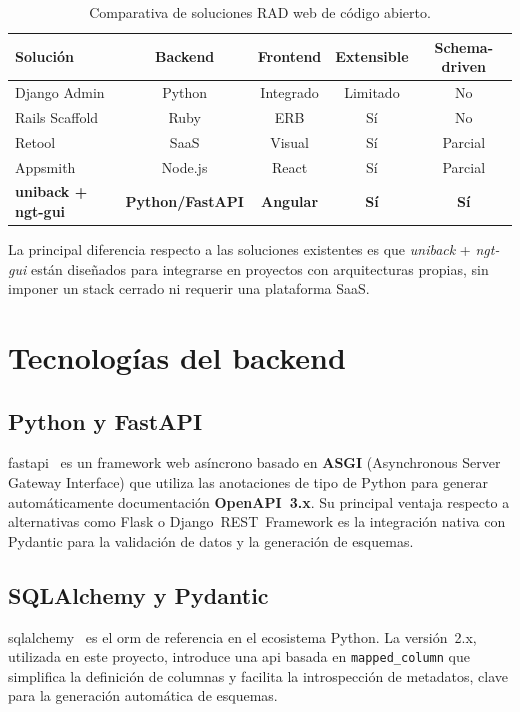 \begin{table}[H]
  \centering
  \caption{Comparativa de soluciones RAD web de código abierto.}
  \label{tab:comparativa-rad}
  \begin{tabular}{lcccc}
    \toprule
    \textbf{Solución} & \textbf{Backend} & \textbf{Frontend} & \textbf{Extensible} &
    \textbf{Schema-driven} \\
    \midrule
    Django Admin & Python & Integrado & Limitado & No \\
    Rails Scaffold & Ruby & ERB & Sí & No \\
    Retool & SaaS & Visual & Sí & Parcial \\
    Appsmith & Node.js & React & Sí & Parcial \\
    \textbf{uniback + ngt-gui} & \textbf{Python/FastAPI} & \textbf{Angular} &
    \textbf{Sí} & \textbf{Sí} \\
    \bottomrule
  \end{tabular}
\end{table}

La principal diferencia respecto a las soluciones existentes es que \textit{uniback} +
\textit{ngt-gui} están diseñados para integrarse en proyectos con arquitecturas propias,
sin imponer un stack cerrado ni requerir una plataforma SaaS.

\section{Tecnologías del backend}
\label{sec:tecnologias-backend}

\subsection{Python y FastAPI}
\label{subsec:fastapi}

\gls{fastapi}~\cite{fastapi} es un framework web asíncrono basado en \textbf{ASGI}
(Asynchronous Server Gateway Interface) que utiliza las anotaciones de tipo de Python para
generar automáticamente documentación \textbf{OpenAPI~3.x}. Su principal ventaja respecto
a alternativas como Flask o Django~REST~Framework es la integración nativa con Pydantic
para la validación de datos y la generación de esquemas.

\subsection{SQLAlchemy y Pydantic}
\label{subsec:orm}

\gls{sqlalchemy}~\cite{sqlalchemy} es el \gls{orm} de referencia en el ecosistema Python.
La versión~2.x, utilizada en este proyecto, introduce una \gls{api} basada en
\texttt{mapped\_column} que simplifica la definición de columnas y facilita la introspección
de metadatos, clave para la generación automática de esquemas.

